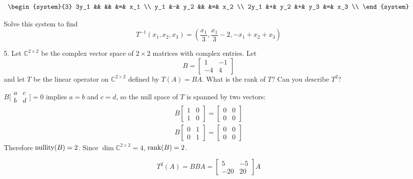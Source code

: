\documentclass{article}
\begin{document}
\begin{enumerate}[listparindent=\parindent]
    \[
        \begin{system}{3}
            3y_1 && && &=& x_1 \\
            y_1 &-& y_2 && &=& x_2 \\
            2y_1 &+& y_2 &+& y_3 &=& x_3 \\
        \end{system}
    \]

    Solve this system to find
    \[ T^{-1}(x_1, x_2, x_3) = (\frac{x_1}{3}, \frac{x_1}{3} - 2, -x_1 + x_2 + x_3) \]

\item[5.] Let \(\mathbb{C}^{2 \times 2}\) be the complex vector space of \(2 \times 2\) matrices with complex entries.
    Let \[ B = \begin{bmatrix} 1 & -1 \\ -4 & 4 \end{bmatrix} \] and let \(T\) be the linear operator on \(\mathbb{C}^{2 \times 2}\)
    defined by \(T(A) = BA\). What is the rank of \(T\)? Can you describe \(T^2\)?

    \(B\bigl[\begin{smallmatrix} a & c \\ b & d \end{smallmatrix}\bigr] = 0\) implies \(a = b\) and \(c = d\), so the null space of \(T\) is spanned by two vectors:
    \begin{gather*}
        B\begin{bmatrix} 1 & 0 \\ 1 & 0 \end{bmatrix} = \begin{bmatrix} 0 & 0 \\ 0 & 0 \end{bmatrix} \\
        B\begin{bmatrix} 0 & 1 \\ 0 & 1 \end{bmatrix} = \begin{bmatrix} 0 & 0 \\ 0 & 0 \end{bmatrix}
    \end{gather*}
    Therefore \(\operatorname{nullity}(B)= 2\). Since \(\dim \mathbb{C}^{2 \times 2} = 4\), \(\operatorname{rank}(B)= 2\).

    \[ T^2(A) = BBA = \begin{bmatrix} 5 & -5 \\ -20 & 20 \end{bmatrix}A \]


\end{enumerate}
\end{document}
